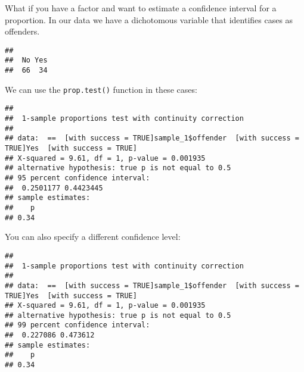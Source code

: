 \documentclass[
]{book}
\newenvironment{Shaded}{\begin{snugshade}}{\end{snugshade}}
\newcommand{\AttributeTok}[1]{\textcolor[rgb]{0.13,0.29,0.53}{#1}}
\newcommand{\CommentTok}[1]{\textcolor[rgb]{0.56,0.35,0.01}{\textit{#1}}}
\newcommand{\DecValTok}[1]{\textcolor[rgb]{0.00,0.00,0.81}{#1}}
\newcommand{\FunctionTok}[1]{\textcolor[rgb]{0.13,0.29,0.53}{\textbf{#1}}}
\newcommand{\NormalTok}[1]{#1}
\newcommand{\SpecialCharTok}[1]{\textcolor[rgb]{0.81,0.36,0.00}{\textbf{#1}}}
\newcommand{\StringTok}[1]{\textcolor[rgb]{0.31,0.60,0.02}{#1}}
\begin{document}
What if you have a factor and want to estimate a confidence interval for a proportion. In our data we have a dichotomous variable that identifies cases as offenders.

\begin{Shaded}
\end{Shaded}

\begin{verbatim}
## 
##  No Yes 
##  66  34
\end{verbatim}

We can use the \texttt{prop.test()} function in these cases:

\begin{Shaded}
\end{Shaded}

\begin{verbatim}
## 
##  1-sample proportions test with continuity correction
## 
## data:  ==  [with success = TRUE]sample_1$offender  [with success = TRUE]Yes  [with success = TRUE]
## X-squared = 9.61, df = 1, p-value = 0.001935
## alternative hypothesis: true p is not equal to 0.5
## 95 percent confidence interval:
##  0.2501177 0.4423445
## sample estimates:
##    p 
## 0.34
\end{verbatim}

You can also specify a different confidence level:

\begin{Shaded}
\end{Shaded}

\begin{verbatim}
## 
##  1-sample proportions test with continuity correction
## 
## data:  ==  [with success = TRUE]sample_1$offender  [with success = TRUE]Yes  [with success = TRUE]
## X-squared = 9.61, df = 1, p-value = 0.001935
## alternative hypothesis: true p is not equal to 0.5
## 99 percent confidence interval:
##  0.227086 0.473612
## sample estimates:
##    p 
## 0.34
\end{verbatim}
\end{document}
